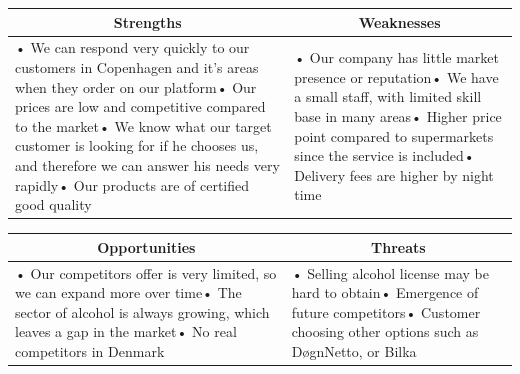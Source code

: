 \documentclass[12p]{article}
\begin{document}
\begin{table}[H]
  \centering
    \begin{tabular}{|p{}|p{}|}
    \hline
    \multicolumn{1}{|c|}{\textbf{Strengths}} & \multicolumn{1}{c|}{\textbf{Weaknesses}} \\
    \hline
    {• We can respond very quickly to our customers in Copenhagen and it's areas when they order on our platform\newline{}• Our prices are low and competitive compared to the market\newline{}• We know what our target customer is looking for if he chooses us, and therefore we can answer his needs very rapidly\newline{}• Our products are of certified good quality} & • Our company has little market presence or reputation\newline{}• We have a small staff, with limited skill base in many areas\newline{}• Higher price point compared to supermarkets since the service is included\newline{}• Delivery fees are higher by night time \\
    \hline
    \end{tabular}
  \label{tab:swot_one}
\end{table}

\begin{table}[H]
  \centering
    \begin{tabular}{|p{}|p{}|}
    \hline
    \multicolumn{1}{|c|}{\textbf{Opportunities}} & \multicolumn{1}{c|}{\textbf{Threats}} \\
    \hline
    {• Our competitors offer is very limited, so we can expand more over time\newline{}• The sector of alcohol is always growing, which leaves a gap in the market\newline{}• No real competitors in Denmark} & • Selling alcohol license may be hard to obtain\newline{}• Emergence of future competitors\newline{}• Customer choosing other options such as DøgnNetto, or Bilka \\
    \hline
    \end{tabular}
  \label{tab:swot_two}
\end{table}

\newpage

\end{document}
